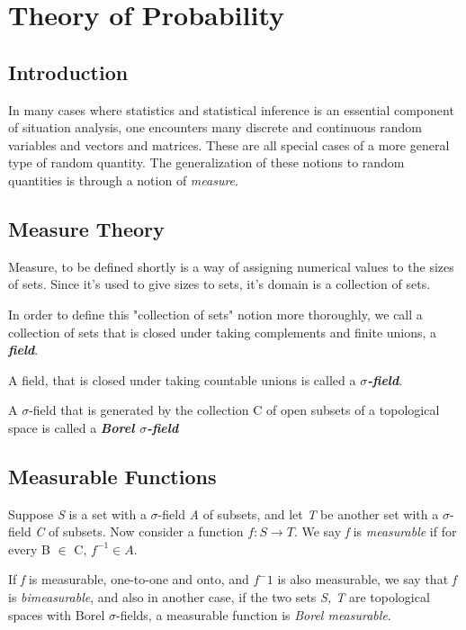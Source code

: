 \documentclass{article}
\begin{document}
\section{Theory of Probability}

\subsection{Introduction}
In many cases where statistics and statistical inference is an essential component of situation analysis, one encounters many discrete and continuous random variables and vectors and matrices. These are all special cases of a more general type of random quantity. The generalization of these notions to random quantities is through a notion of \textit{measure}.

\subsection{Measure Theory}
Measure, to be defined shortly is a way of assigning numerical values to the sizes of sets. Since it's used to give sizes to sets, it's domain is a collection of sets.

In order to define this "collection of sets" notion more thoroughly, we call a collection of sets that is closed under taking complements and finite unions, a \textbf{\textit{field}}.

A field, that is closed under taking countable unions is called a \textbf{\textit{$\sigma$-field}}.

A $\sigma$-field that is generated by the collection C of open subsets of a topological space is called a \textbf{\textit{Borel $\sigma$-field}}
\subsection{Measurable Functions}

Suppose \textit{S} is a set with a $\sigma$-field \textit{A} of subsets, and let \textit{T} be another set with a $\sigma$-field \textit{C} of subsets. Now consider a function $f : S \rightarrow T$. We say \textit{f} is \textit{measurable} if for every B $\in$ C, $f^{-1} \in A$.

If \textit{f} is measurable, one-to-one and onto, and $f^-1$ is also measurable, we say that \textit{f} is \textit{bimeasurable}, and also in another case, if the two sets \textit{S, T} are topological spaces with Borel $\sigma$-fields, a measurable function is \textit{Borel measurable}.
\end{document}
